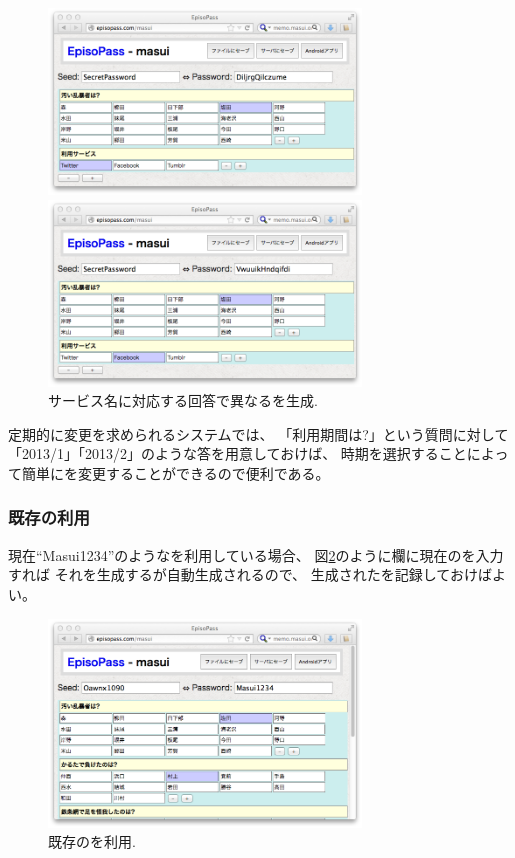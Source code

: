 \documentclass[twoside]{wiss}
\begin{document}
\begin{figure}[H]
\centerline{\includegraphics[width=83mm,bb=0 0 718 428]{figures/a9167a6ec6af9c70dd1617e3fc25ec30.png}}
\centerline{\includegraphics[width=83mm,bb=0 0 718 428]{figures/5b887fabeb8e3319623901fe4a6c56f2.png}}
\caption{サービス名に対応する回答で異なる{\PW}を生成.}
\label{web3}
\end{figure}

定期的に{\PW}変更を求められるシステムでは、
「利用期間は?」という質問に対して
「2013/1」「2013/2」のような答を用意しておけば、
時期を選択することによって簡単に{\PW}を変更することができるので便利である。

\subsubsection{既存{\PW}の利用}

現在``\textsf{Masui1234}''のような{\PW}を利用している場合、
図\ref{web4}のように{\PW}欄に現在の{\PW}を入力すれば
それを生成する{\SS}が自動生成されるので、
生成された{\SS}を記録しておけばよい。

\begin{figure}[H]
\centerline{\includegraphics[width=83mm,bb=0 0 718 479]{figures/fab9c55242e1d52c89ff1b46d77b3168.png}}
\caption{既存の{\PW}を利用.}
\label{web4}
\end{figure}
\end{document}
